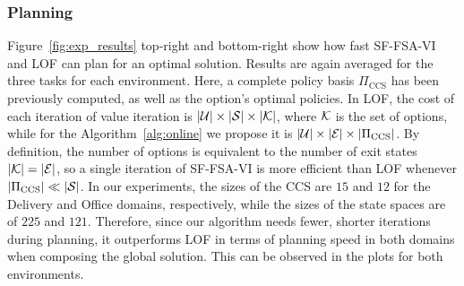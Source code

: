 \subsubsection{Planning} Figure~\ref{fig:exp_results} top-right and bottom-right show how fast SF-FSA-VI and LOF can plan for an optimal solution. Results are again averaged for the three tasks for each environment. Here, a complete policy basis $\Pi_\text{CCS}$ has been previously computed, as well as the option's optimal policies.  In LOF, the cost of each iteration of value iteration is $\lvert\mathcal{U}\rvert\times\lvert\mathcal{S}\rvert\times \lvert\mathcal{K}\rvert$, where $\mathcal{K}$ is the set of options, while for the Algorithm~\ref{alg:online} we propose it is $\lvert\mathcal{U}\rvert\times\lvert\mathcal{E}\rvert\times\lvert\Pi_\text{CCS}\rvert$. By definition, the number of options is equivalent to the number of exit states $\lvert\mathcal{K}\rvert=\lvert\mathcal{E}\rvert$, so a single iteration of SF-FSA-VI is more efficient than LOF whenever $\lvert\Pi_\text{CCS}\rvert \ll \lvert\mathcal{S}\rvert$. In our experiments, the sizes of the CCS are $15$ and $12$ for the Delivery and Office domains, respectively, while the sizes of the state spaces are of $225$ and $121$. Therefore, since our algorithm needs fewer, shorter iterations during planning, it outperforms LOF in terms of planning speed in both domains when composing the global solution. This can be observed in the plots for both environments. 

